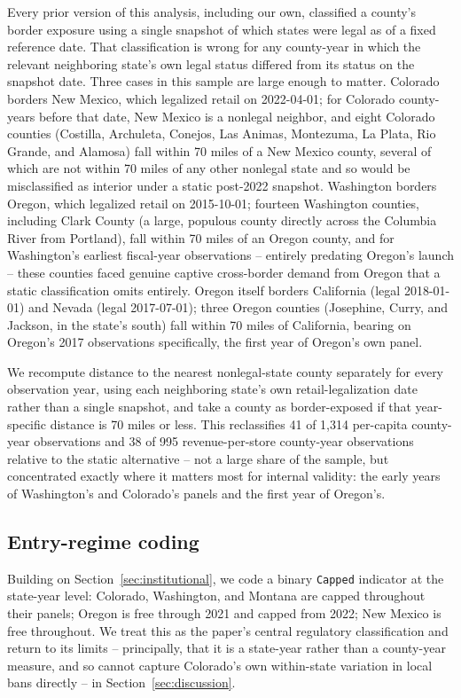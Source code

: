 \documentclass[12pt]{article}
\begin{document}
Every prior version of this analysis, including our own, classified a county's border exposure using a single
snapshot of which states were legal as of a fixed reference date. That classification is wrong for any
county-year in which the relevant neighboring state's own legal status differed from its status on the
snapshot date. Three cases in this sample are large enough to matter. Colorado borders New Mexico, which
legalized retail on 2022-04-01; for Colorado county-years before that date, New Mexico is a nonlegal neighbor,
and eight Colorado counties (Costilla, Archuleta, Conejos, Las Animas, Montezuma, La Plata, Rio Grande, and
Alamosa) fall within 70 miles of a New Mexico county, several of which are not within 70 miles of any other
nonlegal state and so would be misclassified as interior under a static post-2022 snapshot. Washington borders
Oregon, which legalized retail on 2015-10-01; fourteen Washington counties, including Clark County (a large,
populous county directly across the Columbia River from Portland), fall within 70 miles of an Oregon county,
and for Washington's earliest fiscal-year observations -- entirely predating Oregon's launch -- these counties
faced genuine captive cross-border demand from Oregon that a static classification omits entirely. Oregon
itself borders California (legal 2018-01-01) and Nevada (legal 2017-07-01); three Oregon counties (Josephine,
Curry, and Jackson, in the state's south) fall within 70 miles of California, bearing on Oregon's 2017
observations specifically, the first year of Oregon's own panel.

We recompute distance to the nearest nonlegal-state county separately for every observation year, using each
neighboring state's own retail-legalization date rather than a single snapshot, and take a county as
border-exposed if that year-specific distance is 70 miles or less. This reclassifies 41 of 1,314 per-capita
county-year observations and 38 of 995 revenue-per-store county-year observations relative to the static
alternative -- not a large share of the sample, but concentrated exactly where it matters most for internal
validity: the early years of Washington's and Colorado's panels and the first year of Oregon's.

\subsection{Entry-regime coding}

Building on Section~\ref{sec:institutional}, we code a binary \texttt{Capped} indicator at the state-year
level: Colorado, Washington, and Montana are capped throughout their panels; Oregon is free through 2021 and
capped from 2022; New Mexico is free throughout. We treat this as the paper's central regulatory
classification and return to its limits -- principally, that it is a state-year rather than a county-year
measure, and so cannot capture Colorado's own within-state variation in local bans directly -- in
Section~\ref{sec:discussion}.
\end{document}
